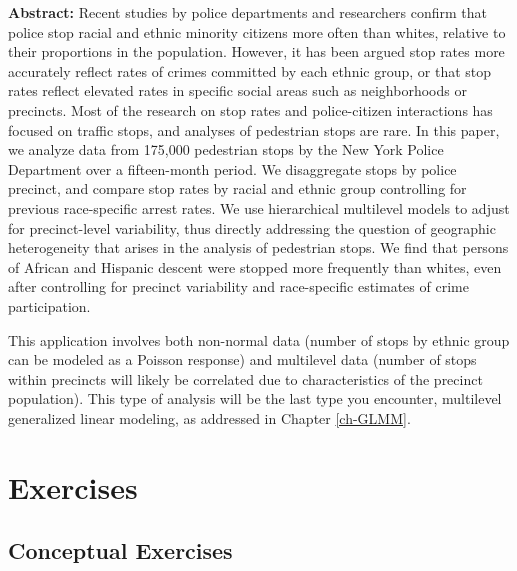 \documentclass[
]{krantz}
\renewenvironment{quote}{\begin{VF}}{\end{VF}}
\begin{document}
\begin{quote}
\textbf{Abstract:} Recent studies by police departments and researchers confirm that police stop racial and ethnic minority citizens more often than whites, relative to their proportions in the population. However, it has been argued stop rates more accurately reflect rates of crimes committed by each ethnic group, or that stop rates reflect elevated rates in specific social areas such as neighborhoods or precincts. Most of the research on stop rates and police-citizen interactions has focused on traffic stops, and analyses of pedestrian stops are rare. In this paper, we analyze data from 175,000 pedestrian stops by the New York Police Department over a fifteen-month period. We disaggregate stops by police precinct, and compare stop rates by racial and ethnic group controlling for previous race-specific arrest rates. We use hierarchical multilevel models to adjust for precinct-level variability, thus directly addressing the question of geographic heterogeneity that arises in the analysis of pedestrian stops. We find that persons of African and Hispanic descent were stopped more frequently than whites, even after controlling for precinct variability and race-specific estimates of crime participation.
\end{quote}

This application involves both non-normal data (number of stops by ethnic group can be modeled as a Poisson response) and multilevel data (number of stops within precincts will likely be correlated due to characteristics of the precinct population). This type of analysis will be the last type you encounter, multilevel generalized linear modeling, as addressed in Chapter \ref{ch-GLMM}.

\section{Exercises}\label{exercises}

\subsection{Conceptual Exercises}\label{conceptual-exercises}
\end{document}
